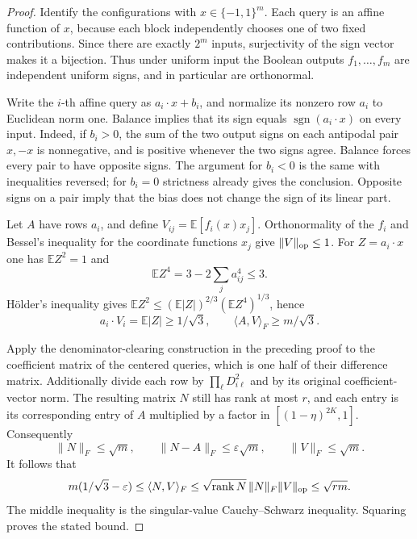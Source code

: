 \documentclass[11pt]{article}
\begin{document}
\begin{proof}
Identify the configurations with $x\in\{-1,1\}^m$. Each query is an
affine function of $x$, because each block independently chooses one
of two fixed contributions. Since there are exactly $2^m$ inputs,
surjectivity of the sign vector makes it a bijection. Thus under
uniform input the Boolean outputs $f_1,\ldots,f_m$ are independent
uniform signs, and in particular are orthonormal.

Write the $i$-th affine query as $a_i\cdot x+b_i$, and normalize its
nonzero row $a_i$ to Euclidean norm one. Balance implies that its
sign equals $\operatorname{sgn}(a_i\cdot x)$ on every input. Indeed,
if $b_i>0$, the sum of the two output signs on each antipodal pair
$x,-x$ is nonnegative, and is positive whenever the two signs agree.
Balance forces every pair to have opposite signs. The argument for
$b_i<0$ is the same with inequalities reversed; for $b_i=0$ strictness
already gives the conclusion. Opposite signs on a pair imply that the
bias does not change the sign of its linear part.

Let $A$ have rows $a_i$, and define
$V_{ij}=\mathbb E[f_i(x)x_j]$. Orthonormality of the $f_i$ and Bessel's
inequality for the coordinate functions $x_j$ give $\|V\|_{\rm op}\leq1$.
For $Z=a_i\cdot x$ one has $\mathbb E Z^2=1$ and
\[
 \mathbb E Z^4=3-2\sum_j a_{ij}^4\leq3.
\]
H\"older's inequality gives
$\mathbb E Z^2\leq
(\mathbb E|Z|)^{2/3}(\mathbb E Z^4)^{1/3}$, hence
\[
 a_i\cdot V_i=\mathbb E|Z|\geq1/\sqrt3,
 \qquad \langle A,V\rangle_F\geq m/\sqrt3.
\]

Apply the denominator-clearing construction in the preceding proof
to the coefficient matrix of the centered queries, which is one half
of their difference matrix. Additionally divide each row by
$\prod_\ell D_{i\ell}^{2}$ and
by its original coefficient-vector norm. The resulting matrix $N$
still has rank at most $r$, and each entry is its corresponding entry
of $A$ multiplied by a factor in $[(1-\eta)^{2K},1]$. Consequently
\[
 \|N\|_F\leq\sqrt m,
 \qquad\|N-A\|_F\leq\varepsilon\sqrt m,
 \qquad\|V\|_F\leq\sqrt m.
\]
It follows that
\[
 m(1/\sqrt3-\varepsilon)
 \leq\langle N,V\rangle_F
 \leq\sqrt{\operatorname{rank}N}\,\|N\|_F\|V\|_{\rm op}
 \leq\sqrt{rm}.
\]
The middle inequality is the singular-value Cauchy--Schwarz inequality.
Squaring proves the stated bound.
\end{proof}
\end{document}
